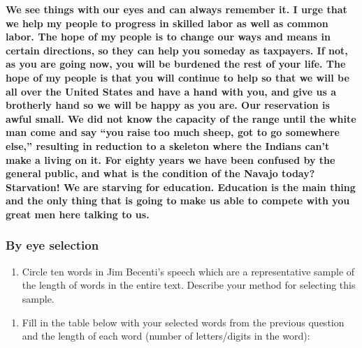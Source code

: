 \documentclass[
]{report}
\providecommand{\tightlist}{%
  \setlength{\itemsep}{0pt}\setlength{\parskip}{0pt}}
\begin{document}
\textbf{We see things with our eyes and can always remember it. I urge that we help my people to progress in skilled labor as well as common labor. The hope of my people is to change our ways and means in certain directions, so they can help you someday as taxpayers. If not, as you are going now, you will be burdened the rest of your life. The hope of my people is that you will continue to help so that we will be all over the United States and have a hand with you, and give us a brotherly hand so we will be happy as you are. Our reservation is awful small. We did not know the capacity of the range until the white man come and say ``you raise too much sheep, got to go somewhere else,'' resulting in reduction to a skeleton where the Indians can't make a living on it. For eighty years we have been confused by the general public, and what is the condition of the Navajo today? Starvation! We are starving for education. Education is the main thing and the only thing that is going to make us able to compete with you great men here talking to us.}

\hypertarget{by-eye-selection}{%
\subsubsection*{By eye selection}\label{by-eye-selection}}

\begin{enumerate}
\def\labelenumi{\arabic{enumi}.}
\tightlist
\item
  Circle ten words in Jim Becenti's speech which are a representative sample of the length of words in the entire text. Describe your method for selecting this sample.
\end{enumerate}

\vspace{0.3in}

\begin{enumerate}
\def\labelenumi{\arabic{enumi}.}
\setcounter{enumi}{1}
\tightlist
\item
  Fill in the table below with your selected words from the previous question and the length of each word (number of letters/digits in the word):
  \vspace{1mm}
\end{enumerate}
\end{document}
